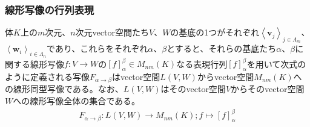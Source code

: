 \documentclass[dvipdfmx]{jsarticle}
\begin{document}
\subsubsection{線形写像の行列表現}%
\begin{thm}
\label{2.1.5.14}
体$K$上の$m$次元、$n$次元vector空間たち$V$、$W$の基底の1つがそれぞれ$\left\langle \mathbf{v}_{j} \right\rangle_{j \in \varLambda_{m}}$、$\left\langle \mathbf{w}_{i} \right\rangle_{i \in \varLambda_{n}}$であり、これらをそれぞれ$\alpha$、$\beta$とすると、それらの基底たち$\alpha 、\beta$に関する線形写像$f:V \rightarrow W$の$[ f]^{\beta}_{\alpha} \in M_{nm}(K)$なる表現行列$[ f]^{\beta}_{\alpha}$を用いて次式のように定義される写像$F_{\alpha \rightarrow \beta}$はvector空間$L(V,W)$からvector空間$M_{nm}(K)$への線形同型写像である。なお、$L(V,W)$はそのvector空間$V$からそのvector空間$W$への線形写像全体の集合である。
\begin{align*}
F_{\alpha \rightarrow \beta}:L(V,W) \rightarrow M_{nm}(K);f \mapsto [ f]^{\beta}_{\alpha}
\end{align*}
\end{thm}
\end{document}
